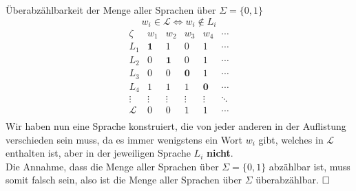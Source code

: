 \documentclass[]{beamer}
\begin{document}
\begin{frame}[squeeze]{}
  \begin{block}{Überabzählbarkeit der Menge aller Sprachen über $\Sigma = \{0, 1\}$}
    \[w_i \in \mathcal{L} \Leftrightarrow w_i \notin L_i\]
    \[\begin{array}{c||c|c|c|c|c|c|c}
        \zeta  & w_1        & w_2        & w_3        & w_4        & \cdots \\
        \hline
        \hline
        L_1    & \textbf{1} & 1          & 0          & 1          & \cdots \\
        \hline
        L_2    & 0          & \textbf{1} & 0          & 1          & \cdots \\
        \hline
        L_3    & 0          & 0          & \textbf{0} & 1          & \cdots \\
        \hline
        L_4    & 1          & 1          & 1          & \textbf{0} & \cdots \\
        \hline
        \vdots & \vdots     & \vdots     & \vdots     & \vdots     & \ddots \\
        \hline
        \mathcal{L}    & 0          & 0          & 1          & 1          & \cdots \\
      \end{array}\]
      \pause
      Wir haben nun eine Sprache konstruiert, die von jeder anderen in der Auflistung verschieden sein muss, da es immer wenigstens ein Wort $w_i$ gibt, welches in $\mathcal{L}$ enthalten ist, aber in der jeweiligen Sprache $L_i$ \textbf{nicht}. \\
      \pause
      \vspace*{0.5em}
      Die Annahme, dass die Menge aller Sprachen über $\Sigma = \{0, 1\}$ abzählbar ist, muss somit falsch sein, also ist die Menge aller Sprachen über $\Sigma$ überabzählbar. $\hfill \square$
  \end{block}
\end{frame}
\end{document}
